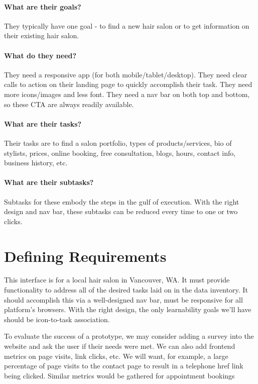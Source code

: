\paragraph{What are their goals?}
They typically have one goal - to find a new hair salon or to get information on their existing hair salon.

\paragraph{What do they need?}
They need a responsive app (for both mobile/tablet/desktop). They need clear calls to action on their landing page to quickly accomplish their task. They need more icons/images and less font. They need a nav bar on both top and bottom, so these CTA are always readily available.

\paragraph{What are their tasks?}
Their tasks are to find a salon portfolio, types of products/services, bio of stylists, prices, online booking, free consultation, blogs, hours, contact info, business history, etc.

\paragraph{What are their subtasks?}
Subtasks for these embody the steps in the gulf of execution. With the right design and nav bar, these subtasks can be reduced every time to one or two clicks.


\section{Defining Requirements}
This interface is for a local hair salon in Vancouver, WA. It must provide functionality to address all of the desired tasks laid on in the data inventory. It should accomplish this via a well-designed nav bar, must be responsive for all platform's browsers. With the right design, the only learnability goals we'll have should be icon-to-task association.

To evaluate the success of a prototype, we may consider adding a survey into the website and ask the user if their needs were met. We can also add frontend metrics on page visits, link clicks, etc. We will want, for example, a large percentage of page visits to the contact page to result in a telephone href link being clicked. Similar metrics would be gathered for appointment bookings


